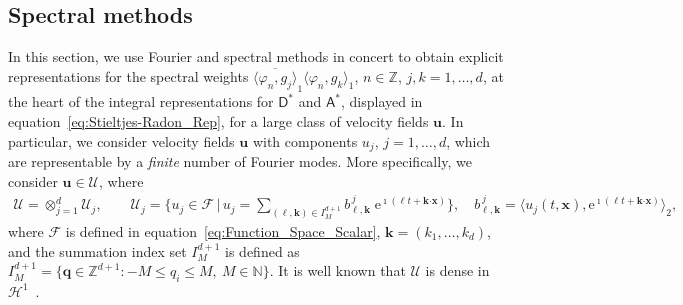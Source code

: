 \documentclass[leqno,onefignum,onetabnum]{siamltex1213}
\newcommand{\e}{\mathrm{e}}
\newcommand{\Uc}{\mathcal{U}}
\newcommand{\Dm}{\mathsf{D}}
\newcommand{\Am}{\mathsf{A}}
\newcommand{\Hs}{\mathscr{H}}
\newcommand{\Fs}{\mathscr{F}}
\providecommand\bcdot{\boldsymbol{\cdot}}
\newcommand{\vecx}{\boldsymbol{x}}
\newcommand{\vecu}{\boldsymbol{u}}
\newcommand{\veck}{\boldsymbol{k}}
\newcommand{\vecq}{\boldsymbol{q}}
\begin{document}
%
\subsection{Spectral methods}
\label{sec:Spectral_Fourier_Methods}
%
In this section, we use Fourier and spectral methods in concert to
obtain explicit representations for the spectral weights
$\overline{\langle\varphi_n,g_j\rangle}_1\langle\varphi_n,g_k\rangle_1$, $n\in\mathbb{Z}$, $j,k=1,\ldots,d$, at
the heart of the integral representations for $\Dm^*$ and
$\Am^*$, displayed in equation~\eqref{eq:Stieltjes-Radon_Rep}, for
a large class of velocity fields $\vecu $. In particular, we consider
velocity fields $\vecu $ with components $u_j$, $j=1,\ldots,d$, which are
representable by a \emph{finite} number of Fourier modes. More
specifically, we consider $\vecu \in\Uc$, where 
%
\begin{align}\label{eq:velocity_field_space}
  \Uc=\otimes_{j=1}^d\Uc_j, \qquad
  \Uc_j=\Big\{u_j\in\Fs \,|\, u_j=\sum_{(\ell,\veck)\in I_M^{d+1}}b^{\,j}_{\ell,\veck}\;\e^{\imath(\ell t+\veck\bcdot\vecx)}\Big\},
   \quad
  b^{\,j}_{\ell,\veck}=\big\langle u_j(t,\vecx),\e^{\imath(\ell t+\veck\bcdot\vecx)}\big\rangle_2, 
\end{align}
%
where $\Fs$ is defined in equation~\eqref{eq:Function_Space_Scalar},
$\veck=(k_1,\ldots,k_d)$, and the summation index set $I_M^{d+1}$ is defined as
$I_M^{d+1}=\{\vecq\in\mathbb{Z}^{d+1}:-M\leq q_i\leq M, \ M\in\mathbb{N}\}$. It is well
known that $\Uc$ is dense in $\Hs^1$~\cite{Folland:99:RealAnalysis}. 
\end{document}
